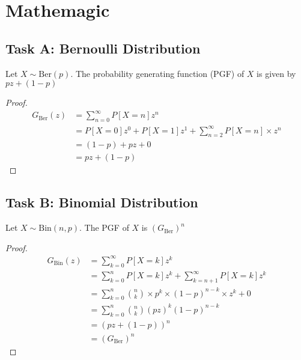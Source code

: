 \section{Mathemagic}
\subsection*{Task A: Bernoulli Distribution}
\begin{claim}
	Let \(X \sim \text{Ber}(p)\). The probability generating function (PGF) of \(X\) is given by \(pz + (1-p)\)
\end{claim}
\begin{proof}
	\begin{align*}
		G_{\textrm{Ber}}(z) & = \sum_{n=0}^\infty P[X = n]z^n                                     \\
		                    & = P[X = 0] z^0 + P[X = 1]z^1 + \sum_{n=2}^\infty P[X = n]\times z^n \\
		                    & = (1-p) + pz + 0                                                    \\
		                    & = pz + (1-p)
	\end{align*}
\end{proof}

\subsection*{Task B: Binomial Distribution}
\begin{claim}
	Let \(X \sim \text{Bin}(n, p)\). The PGF of \(X\) is \((G_{\mathrm{Ber}})^n\)
\end{claim}
\begin{proof}
	\begin{align*}
		G_{\textrm{Bin}}(z) & = \sum_{k=0}^\infty P[X = k]z^k                                            \\
		                    & = \sum_{k=0}^n P[X = k]z^k + \sum_{k=n+1}^\infty P[X = k]z^k               \\
		                    & = \sum_{k=0}^n \binom{n}{k} \times p^k \times (1-p)^{n-k} \times z^{k} + 0 \\
		                    & = \sum_{k=0}^n \binom{n}{k} (pz)^k (1-p)^{n-k}                             \\
		                    & = (pz + (1-p))^n                                                           \\
		                    & = (G_{\textrm{Ber}})^n
	\end{align*}
\end{proof}

